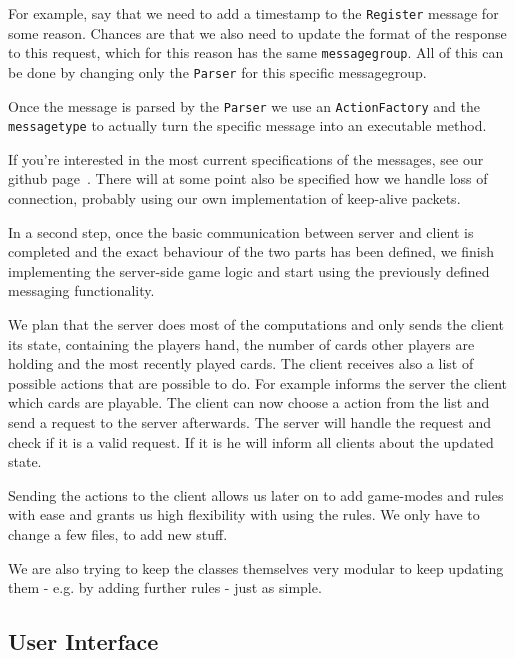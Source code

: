 \documentclass{sig-alternate}
\begin{document}
For example, say that we need to add a timestamp to the \verb|Register| message for some reason. Chances are that we also need to update the format of the response to this request, which for this reason has the same \verb|messagegroup|. All of this can be done by changing only the \verb|Parser| for this specific messagegroup.

Once the message is parsed by the \verb|Parser| we use an \verb|ActionFactory| and the \verb|messagetype| to actually turn the specific message into an executable method.

If you're interested in the most current specifications of the messages, see our github page~\cite{github}. There will at some point also be specified how we handle loss of connection, probably using our own implementation of keep-alive packets.

In a second step, once the basic communication between server and client is completed and the exact behaviour of the two parts has been defined, we finish implementing the server-side game logic and start using the previously defined messaging functionality.

We plan that the server does most of the computations and only sends the client its state, containing the players hand, the number of cards other players are holding and the most recently played cards. The client receives also a list of possible actions that are possible to do. For example informs the server the client which cards are playable. The client can now choose a action from the list and send a request to the server afterwards. The server will handle the request and check if it is a valid request. If it is he will inform all clients about the updated state.

Sending the actions to the client allows us later on to add game-modes and rules with ease and grants us high flexibility with using the rules. We only have to change a few files, to add new stuff.

We are also trying to keep the classes themselves very modular to keep updating them - e.g. by adding further rules - just as simple.

\subsection{User Interface}
\end{document}
